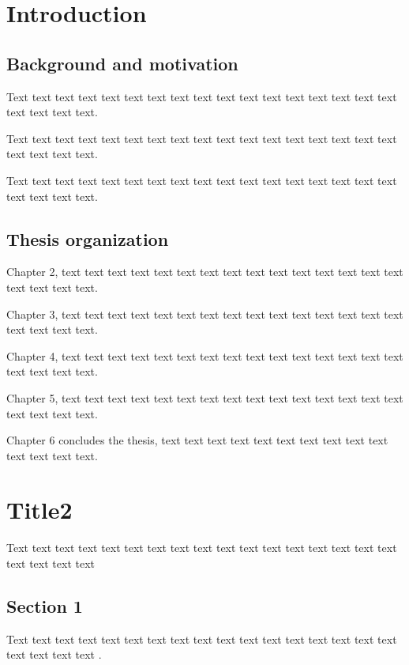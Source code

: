 \documentclass[12pt,a4paper]{article}
\numberwithin{equation}{section}
\begin{document}
{{%
\clearpage
{}
\setcounter{page}{1} 
\justifying \setlength{\parindent}{2em}                  
\setlength{\parindent}{2em}  
\section{Introduction}
\subsection{Background and motivation}
\hspace{2em}Text text text text text text text text text text text text text text text text text text text text text.

Text text text text text text text text text text text text text text text text text text text text text.

Text text text text text text text text text text text text text text text text text text text text text.
\subsection{Thesis organization}
\hspace{2em}Chapter 2, text text text text text text text text text text text text text text text text text text text. 

Chapter 3, text text text text text text text text text text text text text text text text text text text. 

Chapter 4, text text text text text text text text text text text text text text text text text text text. 

Chapter 5, text text text text text text text text text text text text text text text text text text text. 

Chapter 6 concludes the thesis, text text text text text text text text text text text
text text text.

\clearpage
\section{Title2}
\hspace{2em}Text text text text text text text text text text text text text text text text text text text text text
\subsection{Section 1}
\hspace{2em}Text text text text text text text text text text text text text text text text text text text text text \cite{1}.

}}
\end{document}
